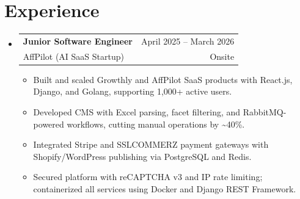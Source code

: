 \documentclass[letterpaper,10.5pt]{article}
\makeatletter
\newcommand{\resumeItem}[1]{
  \item\small{
    {#1 \vspace{-2pt}}
  }
}
\newcommand{\resumeSubSubheading}[4]{
  \vspace{-2pt}\item
    \begin{tabular*}{0.97\textwidth}[t]{l@{\extracolsep{\fill}}r}
      \textbf{#1} & #2 \\[7pt]
      \small#3 & \small #4 \\
    \end{tabular*}\vspace{-2pt}
}
\newcommand{\resumeSubHeadingListStart}{\begin{itemize}[leftmargin=0.15in, label={}]}
\newcommand{\resumeSubHeadingListEnd}{\end{itemize}}
\newcommand{\resumeItemListStart}{\begin{itemize}}
\newcommand{\resumeItemListEnd}{\end{itemize}\vspace{-5pt}}
\makeatother
\begin{document}
\section{Experience}
\vspace{4pt}
  \resumeSubHeadingListStart
    \resumeSubSubheading
      {Junior Software Engineer}{April 2025 -- March 2026}
      {AffPilot (AI SaaS Startup)}{Onsite}
      \vspace{4pt}
      \resumeItemListStart
        \resumeItem{Built and scaled {Growthly} and {AffPilot} SaaS products with {React.js}, {Django}, and {Golang}, supporting {1,000+ active users}.}
        \resumeItem{Developed CMS with Excel parsing, facet filtering, and {RabbitMQ}-powered workflows, cutting manual operations by {\textasciitilde40\%}.}
        \resumeItem{Integrated {Stripe} and {SSLCOMMERZ} payment gateways with Shopify/WordPress publishing via {PostgreSQL} and {Redis}.}
        \resumeItem{Secured platform with reCAPTCHA v3 and IP rate limiting; containerized all services using {Docker} and {Django REST Framework}.}
      \resumeItemListEnd
  \resumeSubHeadingListEnd

\end{document}
